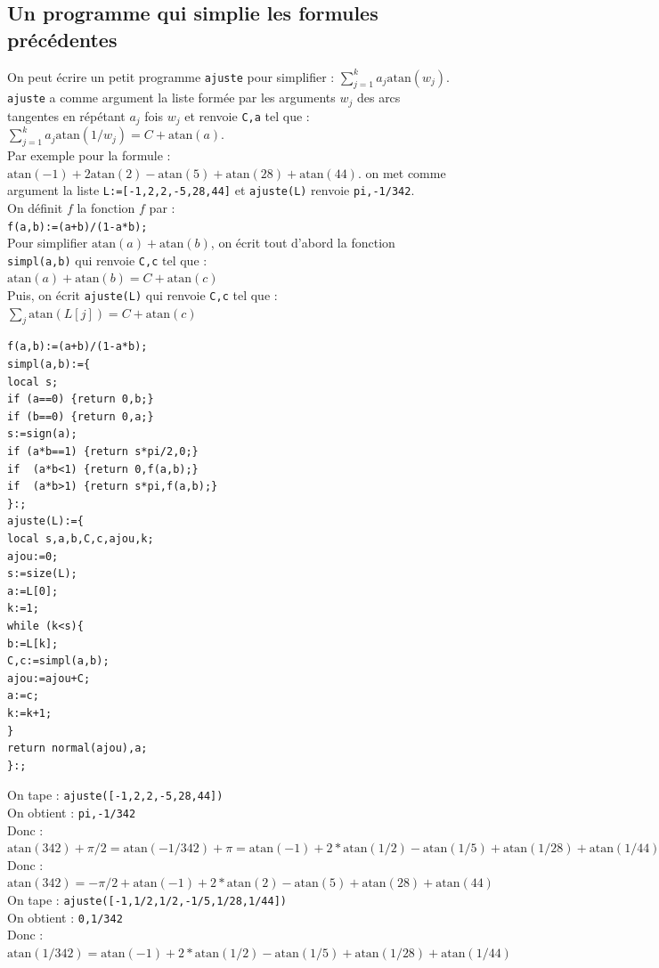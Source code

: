 \documentclass[a4paper,11pt]{book}
\newcommand{\atan}{\mbox{atan}}
\begin{document}
\subsection{Un programme qui simplie les formules pr\'ec\'edentes}
On peut \'ecrire un petit programme {\tt ajuste} pour simplifier :
$\sum_{j=1}^ka_j\atan(w_j)$.\\
{\tt ajuste} a comme argument la liste form\'ee par les arguments $w_j$ des 
arcs tangentes  en r\'ep\'etant $a_j$ fois $w_j$ et renvoie {\tt C,a} 
tel que :\\
$\sum_{j=1}^ka_j\atan(1/w_j)=C+\atan(a)$.\\
Par exemple pour la formule :\\
$\atan(-1)+2\atan(2)-\atan(5)+\atan(28)+\atan(44)$.
on met comme argument la liste {\tt L:=[-1,2,2,-5,28,44]} et {\tt ajuste(L)}
 renvoie {\tt pi,-1/342}.\\
On d\'efinit $f$ la fonction $f$ par :\\
{\tt f(a,b):=(a+b)/(1-a*b);}\\
Pour simplifier $\atan(a)+\atan(b)$, on \'ecrit tout d'abord la fonction 
{\tt simpl(a,b)} qui renvoie {\tt C,c} tel que :\\
$\atan(a)+\atan(b)=C+\atan(c)$\\
Puis,   on \'ecrit {\tt ajuste(L)} qui renvoie {\tt C,c} tel que :\\
$\sum_j\atan(L[j])=C+\atan(c)$
\begin{verbatim}
f(a,b):=(a+b)/(1-a*b);
simpl(a,b):={
local s;
if (a==0) {return 0,b;}
if (b==0) {return 0,a;}
s:=sign(a);
if (a*b==1) {return s*pi/2,0;}
if  (a*b<1) {return 0,f(a,b);}
if  (a*b>1) {return s*pi,f(a,b);}
}:;
ajuste(L):={
local s,a,b,C,c,ajou,k;
ajou:=0;
s:=size(L);
a:=L[0];
k:=1;
while (k<s){
b:=L[k];
C,c:=simpl(a,b);
ajou:=ajou+C;
a:=c;
k:=k+1;
}
return normal(ajou),a;
}:;
\end{verbatim} 
On tape : {\tt ajuste([-1,2,2,-5,28,44])}\\
On obtient : {\tt pi,-1/342}\\
Donc :\\
$\atan(342)+\pi/2=\atan(-1/342)+\pi=\atan(-1)+2*\atan(1/2)-\atan(1/5)+\atan(1/28)+\atan(1/44)$\\
Donc :\\
$\atan(342)=-\pi/2+\atan(-1)+2*\atan(2)-\atan(5)+\atan(28)+\atan(44)$\\
On tape : {\tt ajuste([-1,1/2,1/2,-1/5,1/28,1/44])}\\
On obtient : {\tt 0,1/342}\\
Donc :\\
$\atan(1/342)=\atan(-1)+2*\atan(1/2)-\atan(1/5)+\atan(1/28)+\atan(1/44)$\\
\end{document}
